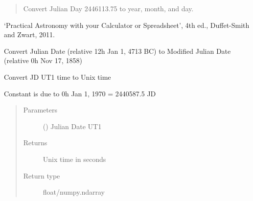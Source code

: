 \documentclass[letterpaper,10pt,english]{sphinxmanual}
\begin{document}
\begin{fulllineitems}
\begin{description}
\end{description}

\begin{quote}

Convert Julian Day 2446113.75 to year, month, and day.

%
\begin{sphinxVerbatim}[commandchars=\\\{\}]
\end{sphinxVerbatim}
\end{quote}

 ‘Practical Astronomy with your Calculator or Spreadsheet’, 4th ed., Duffet-Smith and Zwart, 2011.

\end{fulllineitems}


\begin{fulllineitems}
\label{\detokenize{modules/dpt_tools:dpt_tools.jd_to_mjd}}
Convert Julian Date (relative 12h Jan 1, 4713 BC) to Modified Julian Date (relative 0h Nov 17, 1858)

\end{fulllineitems}


\begin{fulllineitems}
\label{\detokenize{modules/dpt_tools:dpt_tools.jd_to_unix}}
Convert JD UT1 time to Unix time

Constant is due to 0h Jan 1, 1970 = 2440587.5 JD
\begin{quote}\begin{description}
\item[{Parameters}] \leavevmode
{} () \textendash{} Julian Date UT1

\item[{Returns}] \leavevmode
Unix time in seconds

\item[{Return type}] \leavevmode
float/numpy.ndarray

\end{description}\end{quote}

\end{fulllineitems}
\end{document}
